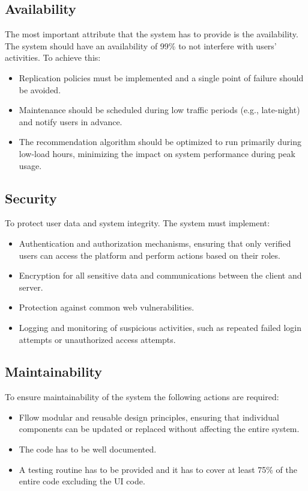 \subsection{Availability}
\label{subsec:availability}%
The most important attribute that the system has to provide is the availability. The
system should have an availability of 99\% to not interfere with users’ activities. To achieve this:
\begin{itemize}
    \item Replication policies must be implemented and a single point of failure should be avoided.
    \item Maintenance should be scheduled during low traffic periods (e.g., late-night) and notify users in advance.
    \item The recommendation algorithm should be optimized to run primarily during low-load hours, minimizing the impact on system performance during peak usage.
\end{itemize}

\subsection{Security}
\label{subsec:security}%
To protect user data and system integrity. The system must implement:
\begin{itemize}
    \item Authentication and authorization mechanisms, ensuring that only verified users can access the platform and perform actions based on their roles.
    \item Encryption for all sensitive data and communications between the client and server.
    \item Protection against common web vulnerabilities.
    \item Logging and monitoring of suspicious activities, such as repeated failed login attempts or unauthorized access attempts.
\end{itemize}

\subsection{Maintainability}
\label{subsec:maintainability}%
To ensure maintainability of the system the following actions are required:
\begin{itemize}
    \item Fllow modular and reusable design principles, ensuring that individual components can be updated or replaced without affecting the entire system.
    \item The code has to be well documented.
    \item A testing routine has to be provided and it has to cover at least 75\% of the entire code excluding the UI code.
\end{itemize}

